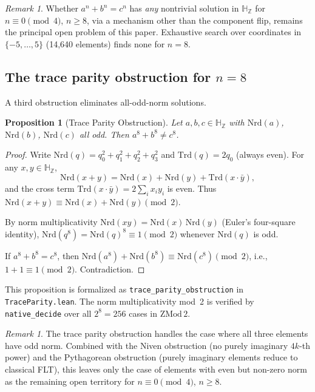 \documentclass[11pt]{amsart}
\theoremstyle{plain}
\newtheorem{proposition}[theorem]{Proposition}
\theoremstyle{definition}
\theoremstyle{remark}
\newtheorem{remark}[theorem]{Remark}
\newcommand{\Z}{\mathbb{Z}}
\newcommand{\HH}{\mathbb{H}}
\begin{document}
\begin{remark}
Whether $a^n + b^n = c^n$ has \emph{any} nontrivial solution in $\HH_\Z$
for $n \equiv 0 \pmod{4}$, $n \geq 8$, via a mechanism other than
the component flip, remains the principal open problem of this paper.
Exhaustive search over coordinates in $\{-5, \ldots, 5\}$
(14{,}640 elements) finds none for $n = 8$.
\end{remark}

\subsection{The trace parity obstruction for $n = 8$}

A third obstruction eliminates all-odd-norm solutions.

\begin{proposition}[Trace Parity Obstruction]\label{prop:traceparity}
Let $a, b, c \in \HH_\Z$ with $\mathrm{Nrd}(a)$, $\mathrm{Nrd}(b)$, $\mathrm{Nrd}(c)$
all odd. Then $a^8 + b^8 \neq c^8$.
\end{proposition}

\begin{proof}
Write $\mathrm{Nrd}(q) = q_0^2 + q_1^2 + q_2^2 + q_3^2$ and
$\mathrm{Trd}(q) = 2q_0$ (always even).
For any $x, y \in \HH_\Z$,
\[
  \mathrm{Nrd}(x + y) = \mathrm{Nrd}(x) + \mathrm{Nrd}(y) + \mathrm{Trd}(x \cdot \bar{y}),
\]
and the cross term $\mathrm{Trd}(x \cdot \bar{y}) = 2\sum_i x_i y_i$ is even.
Thus $\mathrm{Nrd}(x + y) \equiv \mathrm{Nrd}(x) + \mathrm{Nrd}(y) \pmod{2}$.

By norm multiplicativity $\mathrm{Nrd}(xy) = \mathrm{Nrd}(x)\,\mathrm{Nrd}(y)$
(Euler's four-square identity), $\mathrm{Nrd}(q^8) = \mathrm{Nrd}(q)^8 \equiv 1 \pmod{2}$
whenever $\mathrm{Nrd}(q)$ is odd.

If $a^8 + b^8 = c^8$, then $\mathrm{Nrd}(a^8) + \mathrm{Nrd}(b^8) \equiv \mathrm{Nrd}(c^8) \pmod 2$,
i.e., $1 + 1 \equiv 1 \pmod{2}$. Contradiction.
\end{proof}

\noindent
This proposition is formalized as \texttt{trace\_parity\_obstruction}
in \texttt{TraceParity.lean}. The norm multiplicativity mod~2 is verified by
\texttt{native\_decide} over all $2^8 = 256$ cases in $\mathrm{ZMod}\,2$.

\begin{remark}
The trace parity obstruction handles the case where all three elements have odd norm.
Combined with the Niven obstruction (no purely imaginary $4k$-th power) and the
Pythagorean obstruction (purely imaginary elements reduce to classical FLT),
this leaves only the case of elements with even but non-zero norm as the remaining
open territory for $n \equiv 0 \pmod{4}$, $n \geq 8$.
\end{remark}
\end{document}
